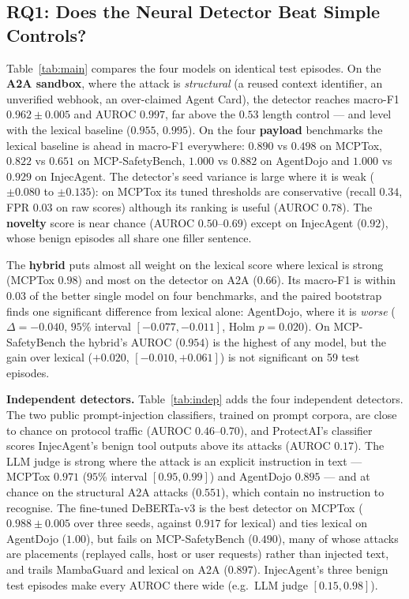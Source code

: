 \documentclass[conference,compsoc]{IEEEtran}
\begin{document}
\subsection{RQ1: Does the Neural Detector Beat Simple Controls?}
\label{sec:res-detect}
Table~\ref{tab:main} compares the four models on identical test episodes. On the \textbf{A2A sandbox}, where the attack is \emph{structural} (a reused context identifier, an unverified webhook, an over-claimed Agent Card), the detector reaches macro-F1 $0.962\pm0.005$ and AUROC $0.997$, far above the $0.53$ length control --- and level with the lexical baseline ($0.955$, $0.995$). On the four \textbf{payload} benchmarks the lexical baseline is ahead in macro-F1 everywhere: $0.890$ vs $0.498$ on MCPTox, $0.822$ vs $0.651$ on MCP-SafetyBench, $1.000$ vs $0.882$ on AgentDojo and $1.000$ vs $0.929$ on InjecAgent. The detector's seed variance is large where it is weak ($\pm0.080$ to $\pm0.135$): on MCPTox its tuned thresholds are conservative (recall $0.34$, FPR $0.03$ on raw scores) although its ranking is useful (AUROC $0.78$). The \textbf{novelty} score is near chance (AUROC $0.50$--$0.69$) except on InjecAgent ($0.92$), whose benign episodes all share one filler sentence.

The \textbf{hybrid} puts almost all weight on the lexical score where lexical is strong (MCPTox $0.98$) and most on the detector on A2A ($0.66$). Its macro-F1 is within $0.03$ of the better single model on four benchmarks, and the paired bootstrap finds one significant difference from lexical alone: AgentDojo, where it is \emph{worse} ($\Delta=-0.040$, $95\%$ interval $[-0.077,-0.011]$, Holm $p=0.020$). On MCP-SafetyBench the hybrid's AUROC ($0.954$) is the highest of any model, but the gain over lexical ($+0.020$, $[-0.010,+0.061]$) is not significant on 59 test episodes.

\textbf{Independent detectors.} Table~\ref{tab:indep} adds the four independent detectors. The two public prompt-injection classifiers, trained on prompt corpora, are close to chance on protocol traffic (AUROC $0.46$--$0.70$), and ProtectAI's classifier scores InjecAgent's benign tool outputs above its attacks (AUROC $0.17$). The LLM judge is strong where the attack is an explicit instruction in text --- MCPTox $0.971$ ($95\%$ interval $[0.95,0.99]$) and AgentDojo $0.895$ --- and at chance on the structural A2A attacks ($0.551$), which contain no instruction to recognise. The fine-tuned DeBERTa-v3 is the best detector on MCPTox ($0.988\pm0.005$ over three seeds, against $0.917$ for lexical) and ties lexical on AgentDojo ($1.00$), but fails on MCP-SafetyBench ($0.490$), many of whose attacks are placements (replayed calls, host or user requests) rather than injected text, and trails MambaGuard and lexical on A2A ($0.897$). InjecAgent's three benign test episodes make every AUROC there wide (e.g.\ LLM judge $[0.15,0.98]$).
\end{document}
